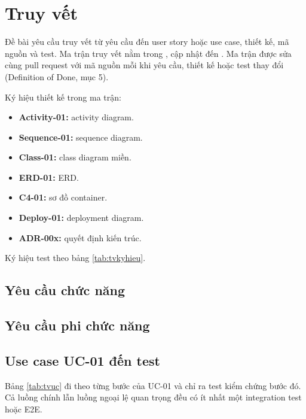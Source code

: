 \section{Truy vết}\label{ch:truyvet}

Đề bài yêu cầu truy vết từ yêu cầu đến user story hoặc use case, thiết kế, mã nguồn và test. Ma trận truy vết nằm trong , cập nhật đến . Ma trận được sửa cùng pull request với mã nguồn mỗi khi yêu cầu, thiết kế hoặc test thay đổi (Definition of Done, mục 5).

Ký hiệu thiết kế trong ma trận:
\begin{itemize}
\item \textbf{Activity-01:} activity diagram.
\item \textbf{Sequence-01:} sequence diagram.
\item \textbf{Class-01:} class diagram miền.
\item \textbf{ERD-01:} ERD.
\item \textbf{C4-01:} sơ đồ container.
\item \textbf{Deploy-01:} deployment diagram.
\item \textbf{ADR-00x:} quyết định kiến trúc.
\end{itemize}

Ký hiệu test theo bảng \ref{tab:tvkyhieu}.

\subsection{Yêu cầu chức năng}


\subsection{Yêu cầu phi chức năng}


\subsection{Use case UC-01 đến test}
Bảng \ref{tab:tvuc} đi theo từng bước của UC-01 và chỉ ra test kiểm chứng bước đó. Cả luồng chính lẫn luồng ngoại lệ quan trọng đều có ít nhất một integration test hoặc E2E.



